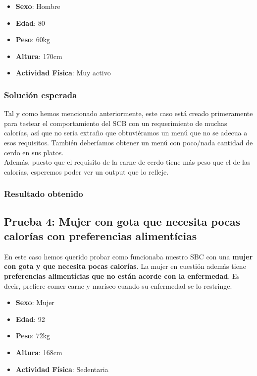\documentclass[12]{article}
\begin{document}
\begin{itemize}
\item \textbf{Sexo}: Hombre
\item \textbf{Edad}: 80
\item \textbf{Peso}: 60kg
\item \textbf{Altura}: 170cm
\item \textbf{Actividad Física}: Muy activo
\end{itemize}

\subsubsection{Solución esperada}
Tal y como hemos mencionado anteriormente, este caso está creado primeramente para testear el comportamiento del SCB con un requerimiento de muchas calorías, así que no sería extraño que obtuviéramos un menú que no se adecua a esos requisitos. También deberíamos obtener un menú con poco/nada cantidad de cerdo en sus platos. 
\\
Además, puesto que el requisito de la carne de cerdo tiene más peso que el de las calorías, esperemos poder ver un output que lo refleje. 

\subsubsection{Resultado obtenido}


\subsection{Prueba 4: Mujer con gota que necesita pocas calorías con preferencias alimentícias}

En este caso hemos querido probar como funcionaba nuestro SBC con una \textbf{mujer con gota y que necesita pocas calorías}. La mujer en cuestión además tiene \textbf{preferencias alimentícias que no están acorde con la enfermedad}. Es decir, prefiere comer carne y marisco cuando su enfermedad se lo restringe. 

\begin{itemize}
\item \textbf{Sexo}: Mujer
\item \textbf{Edad}: 92
\item \textbf{Peso}: 72kg 
\item \textbf{Altura}: 168cm
\item \textbf{Actividad Física}: Sedentaria
\end{itemize}
\end{document}
